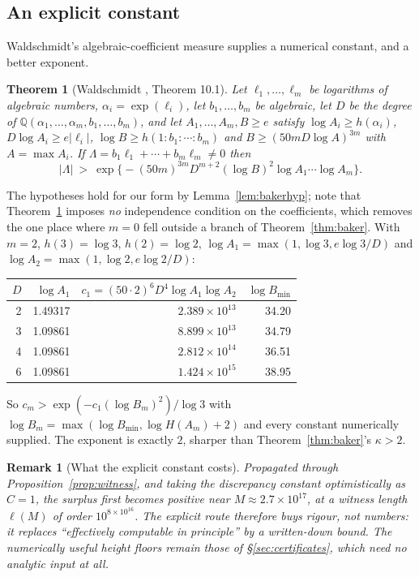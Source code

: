\documentclass[11pt]{article}
\newtheorem{theorem}{Theorem}[section]
\newtheorem*{remark}{Remark}
\newcommand{\Q}{\mathbb{Q}}
\begin{document}
\subsection{An explicit constant}

Waldschmidt's algebraic-coefficient measure supplies a numerical constant, and a better exponent.

\begin{theorem}[Waldschmidt \cite{Waldschmidt2000}, Theorem 10.1]
\label{thm:wald}
Let $\ell_1,\ldots,\ell_m$ be logarithms of algebraic numbers, $\alpha_i=\exp(\ell_i)$, let
$b_1,\ldots,b_m$ be algebraic, let $D$ be the degree of
$\Q(\alpha_1,\ldots,\alpha_m,b_1,\ldots,b_m)$, and let $A_1,\ldots,A_m,B\ge e$ satisfy
$\log A_i\ge h(\alpha_i)$, $D\log A_i\ge e|\ell_i|$, $\log B\ge h(1:b_1:\cdots:b_m)$ and
$B\ge(50mD\log A)^{3m}$ with $A=\max A_i$. If $\Lambda=b_1\ell_1+\cdots+b_m\ell_m\ne0$ then
\[
  |\Lambda|\ >\ \exp\bigl\{-(50m)^{3m}D^{m+2}(\log B)^2\log A_1\cdots\log A_m\bigr\}.
\]
\end{theorem}

The hypotheses hold for our form by Lemma~\ref{lem:bakerhyp}; note that
Theorem~\ref{thm:wald} imposes \emph{no} independence condition on the coefficients, which removes
the one place where $m=0$ fell outside a branch of Theorem~\ref{thm:baker}. With $m=2$,
$h(3)=\log3$, $h(2)=\log2$, $\log A_1=\max(1,\log3,e\log3/D)$ and $\log A_2=\max(1,\log2,e\log2/D)$:

\begin{center}
\begin{tabular}{@{}rrrr@{}}
\toprule
$D$ & $\log A_1$ & $c_1=(50\cdot2)^6D^4\log A_1\log A_2$ & $\log B_{\min}$ \\
\midrule
2 & 1.49317 & $2.389\times10^{13}$ & 34.20 \\
3 & 1.09861 & $8.899\times10^{13}$ & 34.79 \\
4 & 1.09861 & $2.812\times10^{14}$ & 36.51 \\
6 & 1.09861 & $1.424\times10^{15}$ & 38.95 \\
\bottomrule
\end{tabular}
\end{center}

So $c_m>\exp(-c_1(\log B_m)^2)/\log3$ with $\log B_m=\max(\log B_{\min},\log H(A_m)+2)$ and every
constant numerically supplied. The exponent is exactly $2$, sharper than
Theorem~\ref{thm:baker}'s $\kappa>2$.

\begin{remark}[What the explicit constant costs]
Propagated through Proposition~\ref{prop:witness}, and taking the discrepancy constant optimistically
as $C=1$, the surplus first becomes positive near $M\approx2.7\times10^{17}$, at a witness length
$\ell(M)$ of order $10^{8\times10^{16}}$. The explicit route therefore buys \emph{rigour, not
numbers}: it replaces ``effectively computable in principle'' by a written-down bound. The
numerically useful height floors remain those of \S\ref{sec:certificates}, which need no analytic
input at all.
\end{remark}
\end{document}
